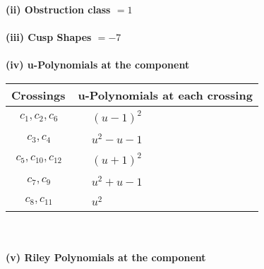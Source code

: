 \documentclass[1p]{elsarticle_modified}
\theoremstyle{definition}
\begin{document}
\flushleft \textbf{(ii) Obstruction class $= 1$}\\~\\
\flushleft \textbf{(iii) Cusp Shapes $= -7$}\\~\\
\newpage\renewcommand{\arraystretch}{1}
\flushleft \textbf{(iv) u-Polynomials at the component}\newline \\
\begin{tabular}{m{50pt}|m{274pt}}
Crossings & \hspace{64pt}u-Polynomials at each crossing \\
\hline $$\begin{aligned}c_{1},c_{2},c_{6}\end{aligned}$$&$\begin{aligned}
&(u-1)^2
\end{aligned}$\\
\hline $$\begin{aligned}c_{3},c_{4}\end{aligned}$$&$\begin{aligned}
&u^2- u-1
\end{aligned}$\\
\hline $$\begin{aligned}c_{5},c_{10},c_{12}\end{aligned}$$&$\begin{aligned}
&(u+1)^2
\end{aligned}$\\
\hline $$\begin{aligned}c_{7},c_{9}\end{aligned}$$&$\begin{aligned}
&u^2+u-1
\end{aligned}$\\
\hline $$\begin{aligned}c_{8},c_{11}\end{aligned}$$&$\begin{aligned}
&u^2
\end{aligned}$\\
\hline
\end{tabular}\\~\\
\newpage\renewcommand{\arraystretch}{1}
\flushleft \textbf{(v) Riley Polynomials at the component}\newline \\
\end{document}
